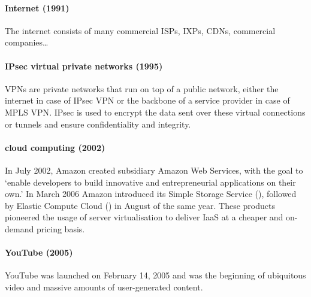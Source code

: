 {\paragraph{Internet (1991)}
The internet consists of many commercial \aclp{ISP}, \glspl{IXP}, \glspl{CDN}, commercial companies\ldots

\paragraph{IPsec virtual private networks (1995)}
\Glspl{VPN} are private networks that run on top of a public network, either the internet in case of IPsec \gls{VPN} or the backbone of a service provider in case of \acs{MPLS} \gls{VPN}.
IPsec is used to encrypt the data sent over these virtual connections or tunnels and ensure confidentiality and integrity.


\paragraph{cloud computing (2002)}
In July 2002, Amazon created subsidiary Amazon Web Services, with the goal to `enable developers to build innovative and entrepreneurial applications on their own.'
In March 2006 Amazon introduced its Simple Storage Service (), followed by Elastic Compute Cloud () in August of the same year.
These products pioneered the usage of server virtualisation to deliver IaaS at a cheaper and on-demand pricing basis.

\paragraph{YouTube (2005)}
YouTube was launched on February 14, 2005 and was the beginning of ubiquitous video and massive amounts of user-generated content.


}

\label{sec:network-topologies}


